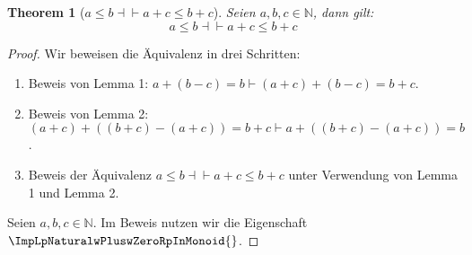\documentclass{book}
\theoremstyle{plain}
\newtheorem{theorem}{Theorem}
\theoremstyle{remark}
\theoremstyle{definition}
\begin{document}
\label{awbwcInNaturalLpaLeqbEqvaPluscLeqbPluscRp}
\begin{theorem}[\(a\leq b\dashv\vdash a+c\leq b+c\)]
Seien \(a,b,c\in\mathbb{N}\), dann gilt:
\[a\leq b\dashv\vdash a+c\leq b+c\]
\end{theorem}
\begin{proof}
Wir beweisen die Äquivalenz in drei Schritten:
\begin{enumerate}
    \item Beweis von Lemma 1: \(a+(b-c)=b \vdash (a+c)+(b-c)=b+c\).
    \item Beweis von Lemma 2: \((a+c)+((b+c)-(a+c))=b+c \vdash a+((b+c)-(a+c))=b\).
    \item Beweis der Äquivalenz \(a\leq b \dashv\vdash a+c\leq b+c\) unter Verwendung von Lemma 1 und Lemma 2.
\end{enumerate}

Seien \(a, b, c \in \mathbb{N}\). Im Beweis nutzen wir die Eigenschaft \(\ImpLpNaturalwPluswZeroRpInMonoid{}\).


\end{proof}
\end{document}
